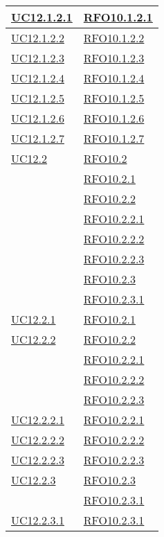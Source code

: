 \begin{longtable}{|>{\centering}m{5cm}|m{5cm}<{\centering}|}
\hyperlink{UC12.1.2.1}{UC12.1.2.1} & \hyperlink{RFO10.1.2.1}{RFO10.1.2.1}\\\hline
\hyperlink{UC12.1.2.2}{UC12.1.2.2} & \hyperlink{RFO10.1.2.2}{RFO10.1.2.2}\\\hline
\hyperlink{UC12.1.2.3}{UC12.1.2.3} & \hyperlink{RFO10.1.2.3}{RFO10.1.2.3}\\\hline
\hyperlink{UC12.1.2.4}{UC12.1.2.4} & \hyperlink{RFO10.1.2.4}{RFO10.1.2.4}\\\hline
\hyperlink{UC12.1.2.5}{UC12.1.2.5} & \hyperlink{RFO10.1.2.5}{RFO10.1.2.5}\\\hline
\hyperlink{UC12.1.2.6}{UC12.1.2.6} & \hyperlink{RFO10.1.2.6}{RFO10.1.2.6}\\\hline
\hyperlink{UC12.1.2.7}{UC12.1.2.7} & \hyperlink{RFO10.1.2.7}{RFO10.1.2.7}\\\hline
\hyperlink{UC12.2}{UC12.2} & \hyperlink{RFO10.2}{RFO10.2}\\\hline
& \hyperlink{RFO10.2.1}{RFO10.2.1}\\
& \hyperlink{RFO10.2.2}{RFO10.2.2}\\
& \hyperlink{RFO10.2.2.1}{RFO10.2.2.1}\\
& \hyperlink{RFO10.2.2.2}{RFO10.2.2.2}\\
& \hyperlink{RFO10.2.2.3}{RFO10.2.2.3}\\
& \hyperlink{RFO10.2.3}{RFO10.2.3}\\
& \hyperlink{RFO10.2.3.1}{RFO10.2.3.1}\\\hline
\hyperlink{UC12.2.1}{UC12.2.1} & \hyperlink{RFO10.2.1}{RFO10.2.1}\\\hline
\hyperlink{UC12.2.2}{UC12.2.2} & \hyperlink{RFO10.2.2}{RFO10.2.2}\\
& \hyperlink{RFO10.2.2.1}{RFO10.2.2.1}\\
& \hyperlink{RFO10.2.2.2}{RFO10.2.2.2}\\
& \hyperlink{RFO10.2.2.3}{RFO10.2.2.3}\\\hline
\hyperlink{UC12.2.2.1}{UC12.2.2.1} & \hyperlink{RFO10.2.2.1}{RFO10.2.2.1}\\\hline
\hyperlink{UC12.2.2.2}{UC12.2.2.2} & \hyperlink{RFO10.2.2.2}{RFO10.2.2.2}\\\hline
\hyperlink{UC12.2.2.3}{UC12.2.2.3} & \hyperlink{RFO10.2.2.3}{RFO10.2.2.3}\\\hline
\hyperlink{UC12.2.3}{UC12.2.3} & \hyperlink{RFO10.2.3}{RFO10.2.3}\\
& \hyperlink{RFO10.2.3.1}{RFO10.2.3.1}\\\hline
\hyperlink{UC12.2.3.1}{UC12.2.3.1} & \hyperlink{RFO10.2.3.1}{RFO10.2.3.1}\\\hline

\end{longtable}

